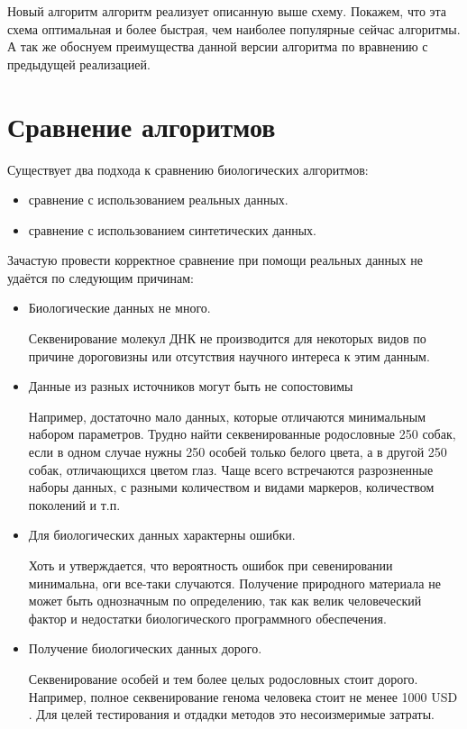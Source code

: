 \documentclass{matmex-diploma-custom}
\begin{document}
Новый алгоритм алгоритм реализует описанную выше схему. Покажем, что
эта схема оптимальная и более быстрая, чем наиболее популярные сейчас
алгоритмы. А так же обоснуем преимущества данной версии алгоритма по
вравнению с предыдущей реализацией.

\section{Сравнение алгоритмов}

Существует два подхода к сравнению биологических алгоритмов:
\begin{itemize}
\item сравнение с использованием реальных данных.
\item сравнение с использованием синтетических данных.
\end{itemize}

Зачастую провести корректное сравнение при помощи реальных данных не
удаётся по следующим причинам:

\begin{itemize}
\item Биологические данных не много.

  Секвенирование молекул ДНК не производится для некоторых видов по
  причине дороговизны или отсутствия научного интереса к этим данным.

\item Данные из разных источников могут быть не сопостовимы

  Например, достаточно мало данных, которые отличаются минимальным
  набором параметров. Трудно найти секвенированные родословные 250
  собак, если в одном случае нужны 250 особей только белого цвета, а в
  другой 250 собак, отличающихся цветом глаз. Чаще всего встречаются
  разрозненные наборы данных, с разными количеством и видами маркеров,
  количеством поколений и т.п.

\item Для биологических данных характерны ошибки.

  Хоть и утверждается, что вероятность ошибок при севенировании
  минимальна, оги все-таки случаются. Получение природного материала
  не может быть однозначным по определению, так как велик человеческий
  фактор и недостатки биологического программного обеспечения.

\item Получение биологических данных дорого.

  Секвенирование особей и тем более целых родословных стоит
  дорого. Например, полное секвенирование генома человека стоит не
  менее 1000 USD \cite{kircher2010high}. Для целей тестирования и
  отдадки методов это несоизмеримые затраты.

\end{itemize}
\end{document}
